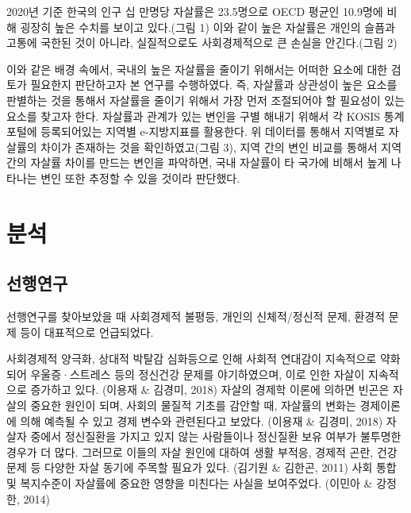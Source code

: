 \documentclass[a4paper, 11pt]{oblivoir}
\begin{document}
    2020년 기준 한국의 인구 십 만명당 자살률은 23.5명으로 OECD 평균인 10.9명에 비해 굉장히 높은 수치를 보이고 있다.(그림 1) 
    이와 같이 높은 자살률은 개인의 슬픔과 고통에 국한된 것이 아니라, 실질적으로도 사회경제적으로 큰 손실을 안긴다.(그림 2)
    
    이와 같은 배경 속에서, 국내의 높은 자살률을 줄이기 위해서는 어떠한 요소에 대한 검토가 필요한지 판단하고자 본 연구를 수행하였다. 
    즉, 자살률과 상관성이 높은 요소를 판별하는 것을 통해서 자살률을 줄이기 위해서 가장 먼저 조절되어야 할 필요성이 있는 요소를 
    찾고자 한다. 자살률과 관계가 있는 변인을 구별 해내기 위해서 각 KOSIS 통계 포털에 등록되어있는 지역별 e-지방지표를 활용한다. 
    위 데이터를 통해서 지역별로 자살률의 차이가 존재하는 것을 확인하였고(그림 3), 지역 간의 변인 비교를 통해서 지역 간의 자살률 차이를 만드는
    변인을 파악하면, 국내 자살률이 타 국가에 비해서 높게 나타나는 변인 또한 추정할 수 있을 것이라 판단했다. 
    
    \section{분석}
    \subsection{선행연구}
    선행연구를 찾아보았을 때 사회경제적 불평등, 개인의 신체적/정신적 문제, 환경적 문제 등이 대표적으로 언급되었다. \\
    \begin{tcolorbox}
        사회경제적 양극화, 상대적 박탈감 심화등으로 인해 사회적 연대감이 지속적으로 약화되어 우울증·스트레스 등의 정신건강 문제를 야기하였으며, 이로 인한 자살이 지속적으로 증가하고 있다.
        (이용재 \& 김경미, 2018) 자살의 경제학 이론에 의하면 빈곤은 자살의 중요한 원인이 되며, 사회의 물질적 기초를 감안할 때, 자살률의 변화는 경제이론에 의해 예측될 수 있고 경제 변수와 관련된다고 보았다.
        (이용재 \& 김경미, 2018) 자살자 중에서 정신질환을 가지고 있지 않는 사람들이나 정신질환 보유 여부가 불투명한 경우가 더 많다. 그러므로 이들의 자살 원인에 대하여 생활 부적응, 경제적 곤란, 건강 문제 등 다양한 자살 동기에 주목할 필요가 있다.  
        (김기원 \& 김한곤, 2011) 사회 통합 및 복지수준이 자살률에 중요한 영향을 미친다는 사실을 보여주었다. (이민아 \& 강정한, 2014)   
    \end{tcolorbox}
    
\end{document}
